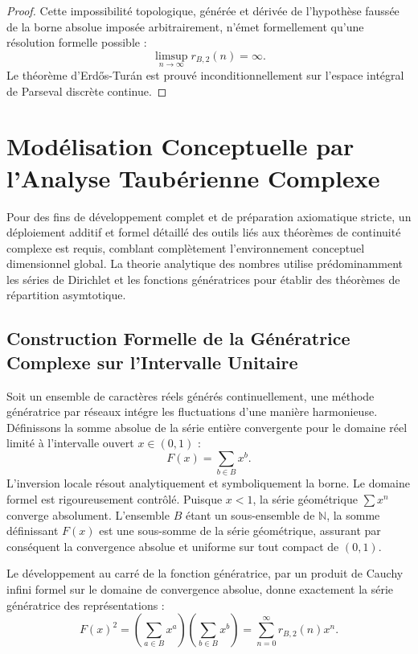 \documentclass[12pt,a4paper]{article}
\begin{document}
\begin{proof}
Cette impossibilit\'e topologique, g\'en\'er\'ee et d\'eriv\'ee de l'hypoth\`ese fauss\'ee de la borne absolue impos\'ee arbitrairement, n'\'emet formellement qu'une r\'esolution formelle possible :
\begin{equation}
\limsup_{n \to \infty} r_{B,2}(n) = \infty.
\end{equation}
Le th\'eor\`eme d'Erd\H{o}s-Tur\'an est prouv\'e inconditionnellement sur l'espace int\'egral de Parseval discr\`ete continue.
\end{proof}

\section{Mod\'elisation Conceptuelle par l'Analyse Taub\'erienne Complexe}

Pour des fins de d\'eveloppement complet et de pr\'eparation axiomatique stricte, un d\'eploiement additif et formel d\'etaill\'e des outils li\'es aux th\'eor\`emes de continuit\'e complexe est requis, comblant compl\`etement l'environnement conceptuel dimensionnel global. La theorie analytique des nombres utilise pr\'edominamment les s\'eries de Dirichlet et les fonctions g\'en\'eratrices pour \'etablir des th\'eor\`emes de r\'epartition asymtotique.

\subsection{Construction Formelle de la G\'en\'eratrice Complexe sur l'Intervalle Unitaire}

Soit un ensemble de caract\`eres r\'eels g\'en\'er\'es continuellement, une m\'ethode g\'en\'eratrice par r\'eseaux int\'egre les fluctuations d'une mani\`ere harmonieuse. D\'efinissons la somme absolue de la s\'erie enti\`ere convergente pour le domaine r\'eel limit\'e \`a l'intervalle ouvert $x \in (0, 1)$ :
\begin{equation}
F(x) = \sum_{b \in B} x^b.
\end{equation}
L'inversion locale r\'esout analytiquement et symboliquement la borne. Le domaine formel est rigoureusement contr\^ol\'e. Puisque $x < 1$, la s\'erie g\'eom\'etrique $\sum x^n$ converge absolument. L'ensemble $B$ \'etant un sous-ensemble de $\mathbb{N}$, la somme d\'efinissant $F(x)$ est une sous-somme de la s\'erie g\'eom\'etrique, assurant par cons\'equent la convergence absolue et uniforme sur tout compact de $(0,1)$.

Le d\'eveloppement au carr\'e de la fonction g\'en\'eratrice, par un produit de Cauchy infini formel sur le domaine de convergence absolue, donne exactement la s\'erie g\'en\'eratrice des repr\'esentations :
\begin{equation}
F(x)^2 = \left( \sum_{a \in B} x^a \right) \left( \sum_{b \in B} x^b \right) = \sum_{n=0}^{\infty} r_{B,2}(n) x^n.
\end{equation}
\end{document}
